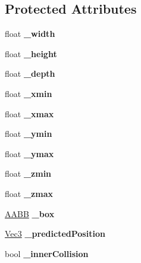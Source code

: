 \subsection*{Protected Attributes}
\begin{DoxyCompactItemize}
\item 
\mbox{\label{classPUBoxCollider_aa35f7392deacc8e76000215a757865fb}} 
float {\bfseries \+\_\+width}
\item 
\mbox{\label{classPUBoxCollider_a11d9d7008f072c0566383c1488da757a}} 
float {\bfseries \+\_\+height}
\item 
\mbox{\label{classPUBoxCollider_a994630a83d53d45768f8b9ec4434fff5}} 
float {\bfseries \+\_\+depth}
\item 
\mbox{\label{classPUBoxCollider_a044b69d5207ea3c4e3002df32102d321}} 
float {\bfseries \+\_\+xmin}
\item 
\mbox{\label{classPUBoxCollider_ade42b1e92d0f2097a9529fa500364725}} 
float {\bfseries \+\_\+xmax}
\item 
\mbox{\label{classPUBoxCollider_a7a61b6948c283c60a2ebfc82c1c9c6b2}} 
float {\bfseries \+\_\+ymin}
\item 
\mbox{\label{classPUBoxCollider_a290aa15e4b969825c7c30eefeb45c989}} 
float {\bfseries \+\_\+ymax}
\item 
\mbox{\label{classPUBoxCollider_a85bfb6597be49e36329a4b4cd91f1499}} 
float {\bfseries \+\_\+zmin}
\item 
\mbox{\label{classPUBoxCollider_a928b4f48e97baad43206052ec9b7cfdc}} 
float {\bfseries \+\_\+zmax}
\item 
\mbox{\label{classPUBoxCollider_a64543f65542f1be050ce734c9d1a9e91}} 
\hyperlink{classAABB}{A\+A\+BB} {\bfseries \+\_\+box}
\item 
\mbox{\label{classPUBoxCollider_a69e19231847fe90e6d0dc8bc6f0e8f18}} 
\hyperlink{classVec3}{Vec3} {\bfseries \+\_\+predicted\+Position}
\item 
\mbox{\label{classPUBoxCollider_a4f6153c23a42e483d5ba3cd3967f7b98}} 
bool {\bfseries \+\_\+inner\+Collision}
\end{DoxyCompactItemize}
